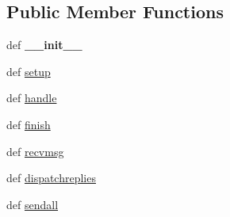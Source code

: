 \subsection*{Public Member Functions}
\begin{DoxyCompactItemize}
\item 
\hypertarget{classcore_1_1coreserver_1_1_base_aux_request_handler_aa9e8b149d4f2e90604f006413d2ab60c}{def {\bfseries \+\_\+\+\_\+init\+\_\+\+\_\+}}\label{classcore_1_1coreserver_1_1_base_aux_request_handler_aa9e8b149d4f2e90604f006413d2ab60c}

\item 
def \hyperlink{classcore_1_1coreserver_1_1_base_aux_request_handler_a1d6c5553dcf495a800fa079a8658f114}{setup}
\item 
def \hyperlink{classcore_1_1coreserver_1_1_base_aux_request_handler_a3cdfb1427343be111d2eb899058b1815}{handle}
\item 
def \hyperlink{classcore_1_1coreserver_1_1_base_aux_request_handler_a7b8791e74aec916780321c8fe204d51d}{finish}
\item 
def \hyperlink{classcore_1_1coreserver_1_1_base_aux_request_handler_ab4ff99ecd6286d2e6e21993941020d4c}{recvmsg}
\item 
def \hyperlink{classcore_1_1coreserver_1_1_base_aux_request_handler_a630e62f71164ccc3a16edd4a0583f2a4}{dispatchreplies}
\item 
def \hyperlink{classcore_1_1coreserver_1_1_base_aux_request_handler_a2d8cfb919685bbc076a3737b0f0c14e7}{sendall}
\end{DoxyCompactItemize}
